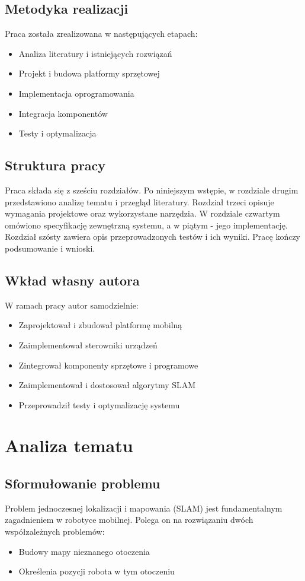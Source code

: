 \documentclass[a4paper,twoside,12pt]{book}
\begin{document}
\section{Metodyka realizacji}
Praca została zrealizowana w następujących etapach:
\begin{itemize}
\item Analiza literatury i istniejących rozwiązań
\item Projekt i budowa platformy sprzętowej
\item Implementacja oprogramowania
\item Integracja komponentów
\item Testy i optymalizacja
\end{itemize}

\section{Struktura pracy}
Praca składa się z sześciu rozdziałów. Po niniejszym wstępie, w rozdziale drugim przedstawiono analizę tematu i przegląd literatury. Rozdział trzeci opisuje wymagania projektowe oraz wykorzystane narzędzia. W rozdziale czwartym omówiono specyfikację zewnętrzną systemu, a w piątym - jego implementację. Rozdział szósty zawiera opis przeprowadzonych testów i ich wyniki. Pracę kończy podsumowanie i wnioski.

\section{Wkład własny autora}
W ramach pracy autor samodzielnie:
\begin{itemize}
\item Zaprojektował i zbudował platformę mobilną
\item Zaimplementował sterowniki urządzeń
\item Zintegrował komponenty sprzętowe i programowe
\item Zaimplementował i dostosował algorytmy SLAM
\item Przeprowadził testy i optymalizację systemu
\end{itemize}


\chapter{Analiza tematu}
\section{Sformułowanie problemu}
Problem jednoczesnej lokalizacji i mapowania (SLAM) jest fundamentalnym zagadnieniem w robotyce mobilnej. Polega on na rozwiązaniu dwóch współzależnych problemów:
\begin{itemize}
\item Budowy mapy nieznanego otoczenia
\item Określenia pozycji robota w tym otoczeniu
\end{itemize}
\end{document}
